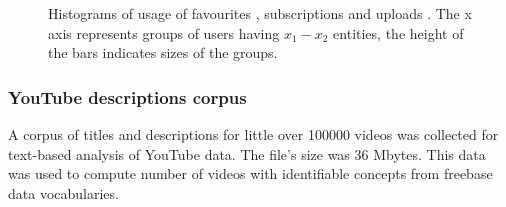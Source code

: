 \begin{figure}[ht]
  \centering
  \label{fig:subfigureExample}
  \caption{Histograms of usage of favourites , subscriptions
   and uploads . The x axis represents groups of
  users having $x_1-x_2$ entities, the height of the bars indicates sizes of the
  groups.}
\end{figure}

\subsubsection{YouTube descriptions corpus}

A corpus of titles and descriptions for little over 100000 videos was collected
for text-based analysis of YouTube data. The file's size was 36 Mbytes. This
data was used to compute number of videos with identifiable concepts from
freebase data vocabularies.

